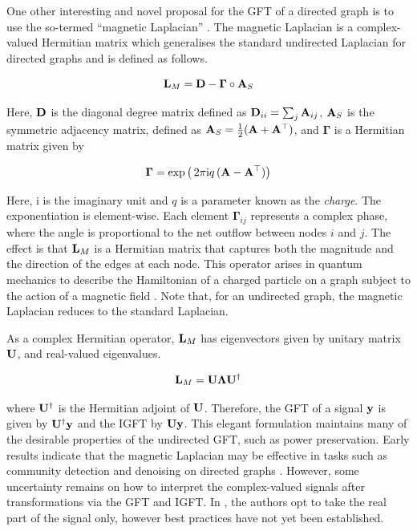 One other interesting and novel proposal for the GFT of a directed graph is to use the so-termed ``magnetic Laplacian'' \citep{DeResende2020,Zhang2021}. The magnetic Laplacian is a complex-valued Hermitian matrix which generalises the standard undirected Laplacian for directed graphs and is defined as follows. 

\begin{equation}
    \mathbf{L}_M = \mathbf{D} - \boldsymbol{\Gamma} \circ \mathbf{A}_S
\end{equation}

Here, $\mathbf{D}$ is the diagonal degree matrix defined as $\mathbf{D}_{ii} = \sum_{j} \mathbf{A}_{ij}$, $\mathbf{A}_S$ is the symmetric adjacency matrix, defined as $\mathbf{A}_S = \frac{1}{2} (\mathbf{A} + \mathbf{A}^\top)$, and $\boldsymbol{\Gamma}$ is a Hermitian matrix given by 

\begin{equation}
    \boldsymbol{\Gamma} = \exp\big( \,2 \pi \text{i} q \, (\mathbf{A} - \mathbf{A}^\top)\big)
\end{equation}

Here, i is the imaginary unit and $q$ is a parameter known as the \textit{charge}. The exponentiation is element-wise. Each element $\boldsymbol{\Gamma}_{ij}$ represents a complex phase, where the angle is proportional to the net outflow between nodes $i$ and $j$. The effect is that $\mathbf{L}_M$ is a Hermitian matrix that captures both the magnitude and the direction of the edges at each node. This operator arises in quantum mechanics to describe the Hamiltonian of a charged particle on a graph subject to the action of a magnetic field \citep{Shubin1994}. Note that, for an undirected graph, the magnetic Laplacian reduces to the standard Laplacian. 

As a complex Hermitian operator, $\mathbf{L}_M$ has eigenvectors given by unitary matrix $\mathbf{U}$, and real-valued eigenvalues. 

\begin{equation}
    \mathbf{L}_M = \mathbf{U} \mathbf{\Lambda} \mathbf{U}^\dagger
\end{equation}

where $\mathbf{U}^\dagger$ is the Hermitian adjoint of $\mathbf{U}$. Therefore, the GFT of a signal $\mathbf{y}$ is given by $\mathbf{U}^\dagger \mathbf{y}$ and the IGFT by $\mathbf{U}\mathbf{y}$. This elegant formulation maintains many of the desirable properties of the undirected GFT, such as power preservation. Early results indicate that the magnetic Laplacian may be effective in tasks such as community detection and denoising on directed graphs \citep{Furutani2020,Fanuel2017}. However, some uncertainty remains on how to interpret the complex-valued signals after transformations via the GFT and IGFT. In \cite{Furutani2020}, the authors opt to take the real part of the signal only, however best practices have not yet been established. 

